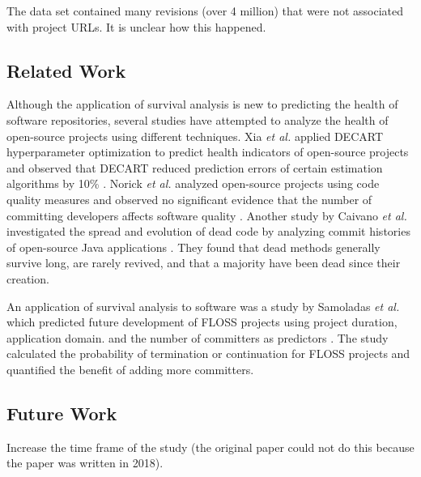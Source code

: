 \documentclass[acmconf]{acmart}
\begin{document}
The data set contained many revisions (over 4 million) that were not associated with project URLs.
It is unclear how this happened.


\subsection{Related Work} \label{related}

Although the application of survival analysis is new to predicting the health of software repositories, several studies have attempted to analyze the health of open-source projects using different techniques. 
Xia \emph{et al.} applied DECART hyperparameter optimization to predict health indicators of open-source projects and observed that DECART reduced prediction errors of certain estimation algorithms by 10\% \cite{xia2020predicting}. 
Norick \emph{et al.} analyzed open-source projects using code quality measures and observed no significant evidence that the number of committing developers affects software quality \cite{norick2010effects}. 
Another study by Caivano \emph{et al.} investigated the spread and evolution of dead code by analyzing commit histories of open-source Java applications \cite{caivano2021exploratory}. 
They found that dead methods generally survive long, are rarely revived, and that a majority have been dead since their creation.

An application of survival analysis to software was a study by Samoladas \emph{et al.} which predicted future development of FLOSS projects using project duration, application domain. and the number of committers as predictors \cite{samoladas2010survival}. 
The study calculated the probability of termination or continuation for FLOSS projects and quantified the benefit of adding more committers.

\subsection{Future Work} \label{future}


Increase the time frame of the study (the original paper could not do this because the paper was written in 2018).
\end{document}
